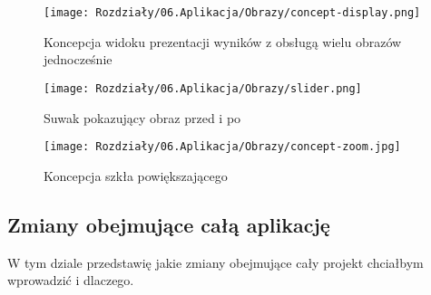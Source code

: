 \begin{figure}[H]
    \centering
    \texttt{[image: Rozdziały/06.Aplikacja/Obrazy/concept-display.png]}
    \caption{Koncepcja widoku prezentacji wyników z obsługą wielu obrazów jednocześnie}
    \label{fig:image97}
\end{figure}
\begin{figure}[ht]
    \centering
    \begin{minipage}[t]{0.3\linewidth}
        \texttt{[image: Rozdziały/06.Aplikacja/Obrazy/slider.png]}
        \caption{Suwak pokazujący obraz przed i po}
        \label{fig:image95}
    \end{minipage}
    \hspace{0.5cm}
    \begin{minipage}[t]{0.5\linewidth}
        \texttt{[image: Rozdziały/06.Aplikacja/Obrazy/concept-zoom.jpg]}
        \caption{Koncepcja szkła powiększającego}
        \label{fig:image96}
    \end{minipage}
\end{figure}


\subsection*{Zmiany obejmujące całą aplikację}

W tym dziale przedstawię jakie zmiany obejmujące cały projekt chciałbym wprowadzić i dlaczego.

